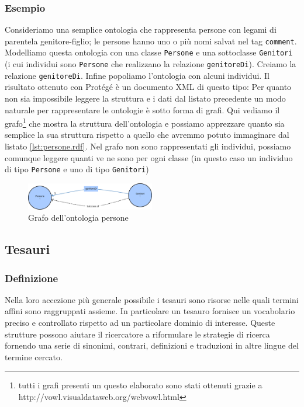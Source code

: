\subsubsection{Esempio}
Consideriamo una semplice ontologia che rappresenta persone con legami di parentela genitore-figlio; le persone hanno uno o più nomi salvat nel tag \verb|comment|. Modelliamo questa ontologia con una classe \verb|Persone| e una sottoclasse \verb|Genitori| (i cui individui sono \verb|Persone| che realizzano la relazione \verb|genitoreDi|). Creiamo la relazione \verb|genitoreDi|. Infine popoliamo l'ontologia con alcuni individui. Il risultato ottenuto con Protégé è un documento XML di questo tipo:
Per quanto non sia impossibile leggere la struttura e i dati dal listato precedente un modo naturale per rappresentare le ontologie è sotto forma di grafi. Qui vediamo il grafo\footnote{tutti i grafi presenti un questo elaborato sono stati ottenuti grazie a http://vowl.visualdataweb.org/webvowl.html} che mostra la struttura dell'ontologia e possiamo apprezzare quanto sia semplice la sua struttura rispetto a quello che avremmo potuto immaginare dal listato \ref{lst:persone.rdf}. Nel grafo non sono rappresentati gli individui, possiamo comunque leggere quanti ve ne sono per ogni classe (in questo caso un individuo di tipo \verb|Persone| e uno di tipo \verb|Genitori|)
\begin{figure}[H]
	\centering
	\includegraphics[width=0.5\textwidth]{Picture/persone.rdf.pdf}
	\caption{Grafo dell'ontologia persone}
\end{figure}


\subsection{Tesauri}
\subsubsection{Definizione}
Nella loro accezione più generale possibile i tesauri sono risorse nelle quali termini affini sono raggruppati assieme\cite{kilgarriff2000s}. In particolare un tesauro fornisce un vocabolario preciso e controllato rispetto ad un particolare dominio di interesse.\cite{srinivasan1992thesaurus} Queste strutture possono aiutare il ricercatore a riformulare le strategie di ricerca fornendo una serie di sinonimi, contrari, definizioni e traduzioni in altre lingue del termine cercato.

